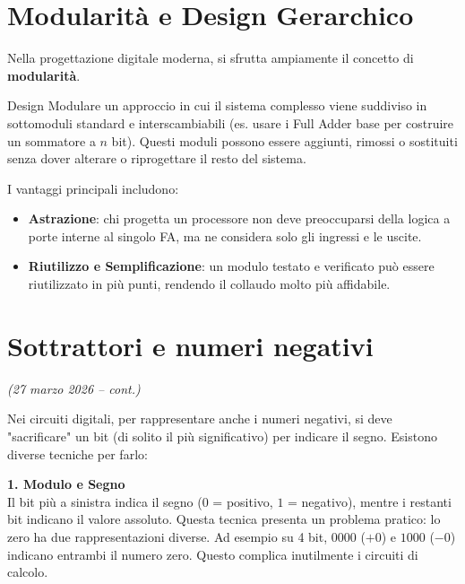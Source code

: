 \section{Modularità e Design Gerarchico}

Nella progettazione digitale moderna, si sfrutta ampiamente il concetto di \textbf{modularità}.

\begin{definizione}{Design Modulare}
un approccio in cui il sistema complesso viene suddiviso in sottomoduli standard e interscambiabili (es. usare i Full Adder base per costruire un sommatore a $n$ bit). Questi moduli possono essere aggiunti, rimossi o sostituiti senza dover alterare o riprogettare il resto del sistema.
\end{definizione}

\noindent I vantaggi principali includono:
\begin{itemize}
    \item \textbf{Astrazione}: chi progetta un processore non deve preoccuparsi della logica a porte interne al singolo FA, ma ne considera solo gli ingressi e le uscite.
    \item \textbf{Riutilizzo e Semplificazione}: un modulo testato e verificato può essere riutilizzato in più punti, rendendo il collaudo molto più affidabile.
\end{itemize}

\section{Sottrattori e numeri negativi}
\textit{(27 marzo 2026 -- cont.)}

Nei circuiti digitali, per rappresentare anche i numeri negativi, si deve "sacrificare" un bit (di solito il più significativo) per indicare il segno. Esistono diverse tecniche per farlo:

\textbf{1. Modulo e Segno}\\
Il bit più a sinistra indica il segno ($0$ = positivo, $1$ = negativo), mentre i restanti bit indicano il valore assoluto. Questa tecnica presenta un problema pratico: lo zero ha due rappresentazioni diverse. Ad esempio su 4 bit, $0000$ ($+0$) e $1000$ ($-0$) indicano entrambi il numero zero. Questo complica inutilmente i circuiti di calcolo.

